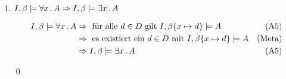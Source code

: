 \begin{enumerate}
\begin{enumerate}
		\begin{align*}
			\I \not\models A \text{ oder } \I \models B & \Rightarrow \text{für alle } \beta \text{ gilt } \Ib \not\models A \text{ oder für alle } \hat{\beta} \text{ gilt } \I, \hat{\beta} \models B	& (\text{Def. Modell})\\
			& \Rightarrow \text{für alle } \beta \text{ gilt } (\Ib \not\models A \text{ oder } \Ib \models B)  					& (\text{Insb. $\beta = \hat\beta$})\\
			& \Rightarrow \text{für alle } \beta \text{ gilt } (\Ib \models \lnot A \text{ oder } \Ib \models B ) 	& (\text{A3})\\
			& \Rightarrow \text{für alle } \beta \text{ gilt } \Ib \models \lnot A \lor B 							& (\text{A4})\\
			& \Rightarrow \text{für alle } \beta \text{ gilt } \Ib \models \lnot A \lor \lnot(\lnot B) 			& (\text{Meta})\\
			& \Rightarrow \text{für alle } \beta \text{ gilt } \Ib \models A \to B									& (\text{De Morgan})\\
			& \Rightarrow \I \models A \to B													& (\text{Def. Modell})\\
		\end{align*}		
		
		\qed		
		
	\end{enumerate}
	
	\item $I, \beta \models \forall x \, . \, A \Rightarrow I, \beta \models\exists x \, . \, A $
	
		\begin{align*}
			I, \beta \models \forall x \, . \, A & \Rightarrow \text{ für alle $d\in D$ gilt } I, \beta \{x \mapsto d\} \models A & (\text{A5})\\
			& \Rightarrow \text{ es existiert ein $d\in D$ mit } I, \beta \{x \mapsto d\} \models A & (\text{Meta})\\
			& \Rightarrow I, \beta \models\exists x \, . \, A & (\text{A5})
		\end{align*}
	
	
	\qed
\end{enumerate}


